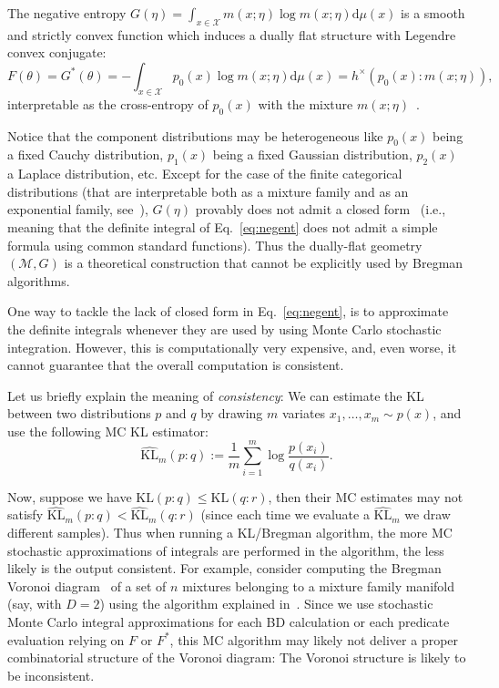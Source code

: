 \documentclass[graybox]{svmult}
\def\dmu{\mathrm{d}\mu}
\def\KL{\mathrm{KL}}
\def\eqdef{:=}
\def\calX{\mathcal{X}}
\def\calM{\mathcal{M}}
\begin{document}
The negative entropy $G(\eta)=\int_{x\in\calX} m(x;\eta)\log m(x;\eta)\dmu(x)$ is a smooth and strictly convex function which induces a dually flat structure with Legendre convex conjugate:
\begin{equation}
F(\theta)=G^*(\theta)=-\int_{x\in\calX} p_0(x)\log m(x;\eta)\dmu(x)=h^\times(p_0(x):m(x;\eta)),
\end{equation} 
interpretable as the cross-entropy of $p_0(x)$ with the mixture $m(x;\eta)$~\cite{wmixture-2017}.


Notice that the component distributions may be heterogeneous like $p_0(x)$ being a fixed Cauchy distribution, $p_1(x)$ being a fixed Gaussian distribution, $p_2(x)$ a Laplace distribution, etc.
Except for the case of the finite categorical distributions (that are
 interpretable  both as  a mixture family and as an exponential family, see~\cite{IG-2016}), $G(\eta)$  provably does not admit a closed form~\cite{KLnotanalytic-2004} (i.e., meaning that the definite integral of Eq.~\ref{eq:negent} does not admit a simple formula using common standard functions). 
Thus the    dually-flat geometry $(\calM,G)$ is a theoretical construction that cannot be explicitly used by Bregman algorithms.

One way to tackle the lack of closed form in Eq.~\ref{eq:negent}, is
to approximate the definite integrals whenever they are used by using Monte Carlo stochastic integration.
However, this is computationally very expensive, and, even worse, it cannot guarantee that the overall computation is consistent.

Let us briefly explain the meaning of {\em consistency}:
We can estimate the KL between two distributions $p$ and $q$ by drawing $m$ variates $x_1,\ldots,x_m \sim p(x)$, and use  
the following MC KL estimator:
\begin{equation}
\widehat{\KL}_m(p:q) \eqdef \frac{1}{m} \sum_{i=1}^m    \log \frac{p(x_i)}{q(x_i)}.
\end{equation}

Now, suppose we have $\KL(p:q)\leq \KL(q:r)$, then their MC estimates may not satisfy $\widehat{\KL}_m(p:q)<\widehat{\KL}_m(q:r)$ (since each time we evaluate a $\widehat{\KL}_m$ we draw different samples).
Thus when running a KL/Bregman algorithm, the more MC stochastic  approximations of integrals are performed in the algorithm, the less likely is the output consistent.
For example, consider computing the Bregman Voronoi diagram~\cite{BVD-2007} of a set of $n$ mixtures belonging to a mixture family manifold (say, with $D=2$) using the algorithm explained in~\cite{BVD-2007}.
Since we use  stochastic Monte Carlo integral approximations for each
BD calculation or each predicate evaluation relying on $F$ or $F^*$, this MC algorithm may likely not deliver a proper  combinatorial structure of the Voronoi diagram: The Voronoi structure is likely to be inconsistent.
\end{document}

